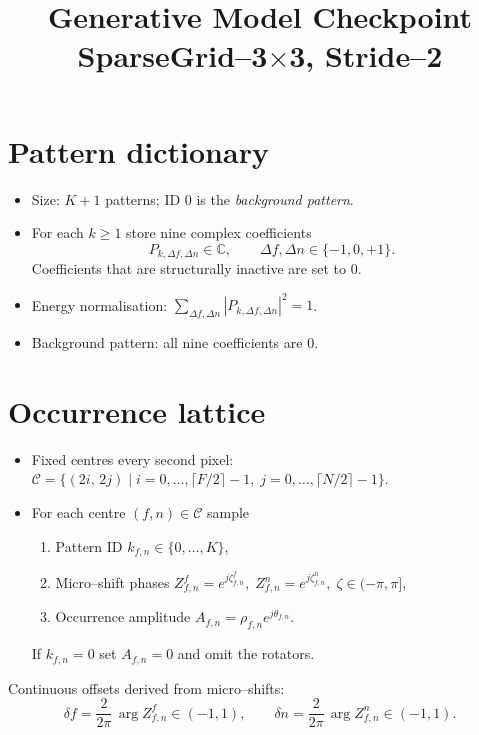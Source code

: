 \documentclass[11pt]{article}
\title{Generative Model Checkpoint\\SparseGrid--3$\times$3, Stride--2}
\date{}
\begin{document}
\maketitle

\section{Pattern dictionary}

\begin{itemize}
  \item Size: $K\!+\!1$ patterns; ID $0$ is the \emph{background pattern}.
  \item For each $k\ge 1$ store nine complex coefficients
        \[
           P_{k,\Delta f,\Delta n}\in\mathbb C,
           \qquad \Delta f,\Delta n\in\{-1,0,+1\}.
        \]
        Coefficients that are structurally inactive are set to $0$.
  \item Energy normalisation:
        $\displaystyle\sum_{\Delta f,\Delta n}|P_{k,\Delta f,\Delta n}|^{2}=1$.
  \item Background pattern: all nine coefficients are $0$.
\end{itemize}

\section{Occurrence lattice}

\begin{itemize}
  \item Fixed centres every second pixel:
        $\mathcal C=\{(2i,\,2j)\mid i=0,\dots,\lceil F/2\rceil-1,\;
        j=0,\dots,\lceil N/2\rceil-1\}$.
  \item For each centre $(f,n)\in\mathcal C$ sample
        \begin{enumerate}
          \item Pattern ID $k_{f,n}\in\{0,\dots,K\}$,
          \item Micro--shift phases
            $Z^{f}_{f,n}=e^{j\zeta^{f}_{f,n}},\;
             Z^{n}_{f,n}=e^{j\zeta^{n}_{f,n}},\;
             \zeta\in(-\pi,\pi]$,
          \item Occurrence amplitude $A_{f,n}=\rho_{f,n}e^{j\theta_{f,n}}$.
        \end{enumerate}
        If $k_{f,n}=0$ set $A_{f,n}=0$ and omit the rotators.
\end{itemize}

Continuous offsets derived from micro--shifts:
\[
\delta f = \frac{2}{2\pi}\,\arg Z^{f}_{f,n}\in(-1,1),
\qquad
\delta n = \frac{2}{2\pi}\,\arg Z^{n}_{f,n}\in(-1,1).
\]
\end{document}
